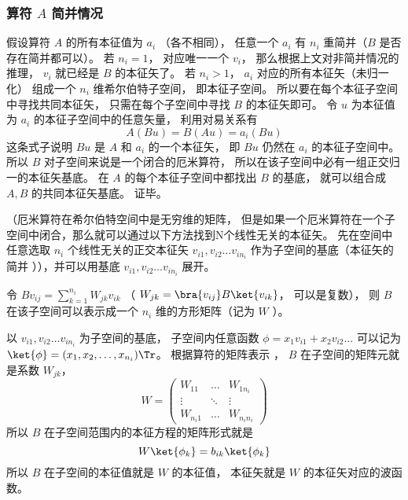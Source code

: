 \subsubsection{算符 $A$ 简并情况}
假设算符 $A$ 的所有本征值为 $a_i$ （各不相同）， 任意一个 $a_i$ 有 $n_i$ 重简并（$B$ 是否存在简并都可以）。 若 $n_i = 1$，  对应唯一一个 $v_i$，  那么根据上文对非简并情况的推理， $v_i$ 就已经是 $B$ 的本征矢了。 若 $n_i > 1$， $a_i$ 对应的所有本征矢（未归一化） 组成一个 $n_i$ 维希尔伯特子空间， 即本征子空间。 所以要在每个本征子空间中寻找共同本征矢， 只需在每个子空间中寻找 $B$ 的本征矢即可。 令 $u$ 为本征值为 $a_i$ 的本征子空间中的任意矢量， 利用对易关系有
\begin{equation}
A (B u) = B (A u) = a_i (B u)
\end{equation}
这条式子说明 $B u$ 是 $A$ 和 $a_i$ 的一个本征矢， 即 $B u$ 仍然在 $a_i$ 的本征子空间中。 所以 $B$ 对子空间来说是一个闭合的厄米算符， 所以在该子空间中必有一组正交归一的本征矢基底。 在 $A$ 的每个本征子空间中都找出 $B$ 的基底， 就可以组合成 $A, B$ 的共同本征矢基底。 证毕。


（厄米算符在希尔伯特空间中是无穷维的矩阵， 但是如果一个厄米算符在一个子空间中闭合，那么就可以通过以下方法找到N个线性无关的本征矢。%
先在空间中任意选取 $n_i$ 个线性无关的正交本征矢 $v_{i1}, v_{i2}\dots v_{i n_i}$ 作为子空间的基底（本征矢的简并%
）），并可以用基底 $v_{i1}, v_{i2}\dots v_{i n_i}$ 展开。

令 $B v_{ij} = \sum_{k=1}^{n_i} W_{jk}v_{ik}$ （ $W_{jk} = \bra{v_{ij}} B \ket{v_{ik}}$， 可以是复数）， 则 $B$ 在该子空间可以表示成一个 $n_i$ 维的方形矩阵（记为 $W$ ）。

以 $v_{i1}, v_{i2} \dots v_{i n_i}$ 为子空间的基底， 子空间内任意函数 $\phi  = x_1 v_{i1} + x_2 v_{i2}\dots$ 可以记为 $\ket{\phi} = (x_1, x_2, \dots, x_{n_i})\Tr$。 根据算符的矩阵表示
， $B$ 在子空间的矩阵元就是系数 $W_{jk}$， 
\begin{equation}
W = \begin{pmatrix}
W_{11} & \ldots & W_{1 n_i}\\
\vdots & \ddots & \vdots \\
W_{n_i 1} & \ldots & W_{n_i n_i}
\end{pmatrix}
\end{equation}
所以 $B$ 在子空间范围内的本征方程的矩阵形式就是
\begin{equation}
W \ket{\phi_k} = b_{ik} \ket{\phi_k}
\end{equation}
所以 $B$ 在子空间的本征值就是 $W$ 的本征值， 本征矢就是 $W$ 的本征矢对应的波函数。

